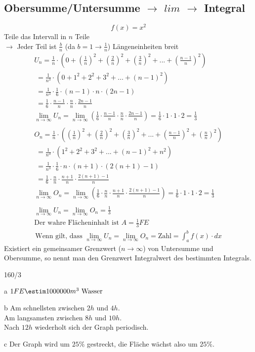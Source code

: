 \subsection{Obersumme/Untersumme $\rightarrow$ $lim$ $\rightarrow$ Integral}
$$f(x) = x^2$$
Teile das Intervall in $n$ Teile \\
\gap $\rightarrow$ Jeder Teil ist $\frac{b}{n}$ (da $b = 1 \rightarrow \frac{1}{n}$) Längeneinheiten breit
\begin{gather*}
  U_n = \frac{1}{n} \cdot (0 + (\frac{1}{n})^2 + (\frac{2}{n})^2 + (\frac{3}{n})^2 + ... + (\frac{n-1}{n})^2) \\
  \;= \frac{1}{n^3} \cdot (0 + 1^2 + 2^2 + 3^2 + ... + (n-1)^2) \\
  \;= \frac{1}{n^3} \cdot \frac{1}{6} \cdot (n - 1) \cdot n \cdot (2n - 1) \\
  \;= \frac{1}{6} \cdot \frac{n - 1}{n} \cdot \frac{n}{n} \cdot \frac{2n - 1}{n} \\
  \lim\limits_{n \to \infty} U_n = \lim\limits_{n \to \infty} (\frac{1}{6} \cdot \frac{n - 1}{n} \cdot \frac{n}{n} \cdot \frac{2n - 1}{n}) = \frac{1}{6} \cdot 1 \cdot 1 \cdot 2 = \frac{1}{3} \\\\
  O_n = \frac{1}{n} \cdot ((\frac{1}{n})^2 + (\frac{2}{n})^2 + (\frac{3}{n})^2 + ... + (\frac{n-1}{n})^2 + (\frac{n}{n})^2) \\
  \;= \frac{1}{n^3} \cdot (1^2 + 2^2 + 3^2 + ... + (n-1)^2 + n^2) \\
  \;= \frac{1}{n^3} \cdot \frac{1}{6} \cdot n \cdot (n + 1) \cdot (2(n + 1) - 1) \\
  \;= \frac{1}{6} \cdot \frac{n}{n} \cdot \frac{n + 1}{n} \cdot \frac{2(n + 1) - 1}{n} \\
  \lim\limits_{n \to \infty} O_n = \lim\limits_{n \to \infty} (\frac{1}{6} \cdot \frac{n}{n} \cdot \frac{n + 1}{n} \cdot \frac{2(n + 1) - 1}{n}) = \frac{1}{6} \cdot 1 \cdot 1 \cdot 2 = \frac{1}{3} \\\\
  \lim\limits_{n \to \infty} U_n = \lim\limits_{n \to \infty} O_n = \frac{1}{3} \\
  \text{Der wahre Flächeninhalt ist $A = \frac{1}{3}FE$}
\end{gather*}
\begin{gather*}
  \text{Wenn gilt, dass } \lim\limits_{n \to \infty} U_n = \lim\limits_{n \to \infty} O_n = \text{Zahl} = \int_a^b f(x) \cdot dx
\end{gather*}
Existiert ein gemeinsamer Grenzwert ($n \to \infty$) von Untersumme und Obersumme, so nennt man den Grenzwert Integralwert des bestimmten Integrals.
\newpage
\begin{exercise}{160/3}
  \item [a]
  $1FE \estim 1000000m^3 \text{ Wasser}$
  \item [b]
  Am schnellsten zwischen $2h$ und $4h$. \\
  Am langsamsten zwischen $8h$ und $10h$. \\
  Nach $12h$ wiederholt sich der Graph periodisch.
  \item [c]
  Der Graph wird um $25\%$ gestreckt, die Fläche wächst also um $25\%$.
\end{exercise}
